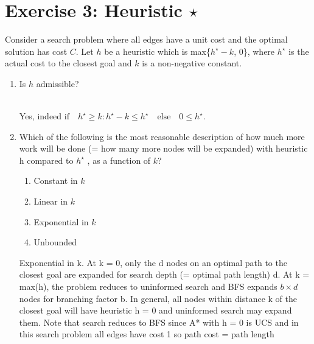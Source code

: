 \documentclass[9pt,a4paper]{extarticle}
\newenvironment{solution}
    {%
    \color{red}
    }
    { 
    \color{black}
    }
\begin{document}
\section*{Exercise 3: Heuristic $\star$}
Consider a search problem where all edges have a unit cost and the optimal solution has cost $C$. Let $h$ be a heuristic which is max\{$h^\star - k$, 0\}, where $h^\star$ is the actual cost to the closest goal and $k$ is a non-negative constant.
\begin{enumerate}
    \item Is $h$ admissible?
    \begin{solution}
    \\
    Yes, indeed $\text{if} \quad h^\star \geq k: h^\star - k \leq h^\star \quad \text{else} \quad 0 \leq h^\star$.
    \end{solution}
    \item Which of the following is the most reasonable description of how much more work will be done (= how many more nodes will be expanded) with heuristic h compared to $h^\star$ , as a function of $k$?
    \begin{enumerate}
        \item Constant in $k$
        \item Linear in $k$
        \item Exponential in $k$
        \item Unbounded
    \end{enumerate}
    \begin{solution}
    Exponential in k. At k = 0, only the d nodes on an optimal path to the closest goal are expanded for search depth (= optimal path length) d. At k = max(h), the problem reduces to uninformed search and BFS expands $b \times d$ nodes for branching factor b. In general, all nodes within distance k of the closest goal will have heuristic h = 0 and uninformed search may expand them. Note that search reduces to BFS since A* with h = 0 is UCS and in this search problem all edges have cost 1 so path cost = path length
    \end{solution}
\end{enumerate}
\end{document}
